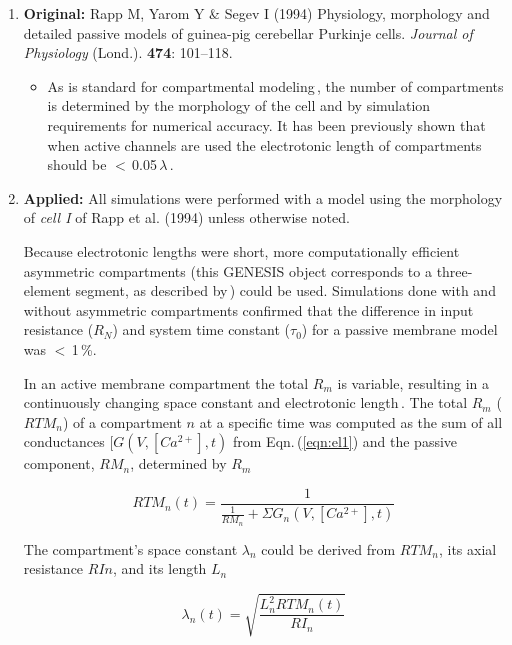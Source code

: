 \documentclass[12pt]{article}
\begin{document}
\begin{enumerate}

   \item {\bf Original:} Rapp M, Yarom Y \& Segev I (1994) Physiology, morphology and detailed passive models of guinea-pig cerebellar Purkinje cells. {\it Journal of Physiology} (Lond.). {\bf 474}: 101--118.
   \begin{itemize}
      \item As is standard for compartmental modeling\,\cite{W:1962nx, W:1964oq},
the number of compartments is determined by the morphology of the cell and by
simulation requirements for numerical accuracy. It has been previously shown that when active channels are used
the electrotonic length of compartments should be $<$\,0.05\,$\lambda$\,\cite{W:1966ve}.
   \end{itemize}

   \item {\bf Applied:} All simulations were performed with a model using the morphology of {\it cell I} of Rapp et
al. (1994) unless otherwise noted.
   
   Because electrotonic
lengths were short, more computationally
efficient asymmetric compartments (this GENESIS object corresponds
to a three-element segment, as described by\,\cite{Segev-I:1985kl}) could be used. Simulations done with and without asymmetric compartments
confirmed that the difference in input resistance ($R_N$) and
system time constant ($\tau_0$) for a passive membrane model was
$<$\,1\,\%.

In an active membrane compartment the total $R_m$ is variable,
resulting in a continuously changing space constant and electrotonic 
length\,\cite{Bernander-O:1991tg, Rapp-M:1992kx}.
The total $R_m$ ($RTM_n$) of a compartment $n$ at a specific time was
computed as the sum of all conductances $[ G(V, [ Ca^{2+}] ,t)$ from Eqn.\,(\ref{eqn:el1}) and the passive component, $RM_n$, determined by $R_m$

\begin{equation}
\label{eqn:el1}
   RTM_n(t) = \frac{1}{\frac{1}{RM_n}+\Sigma G_n(V,[ Ca^{2+}] ,t)}
\end{equation}

The compartment's space constant $\lambda_n$ could be derived from $RTM_n$, its axial resistance $RIn$, and its length $L_n$

\begin{equation}
   \lambda_n(t) = \sqrt{\frac{L^2_nRTM_n(t)}{RI_n}}
\end{equation}


\end{enumerate}
\end{document}
